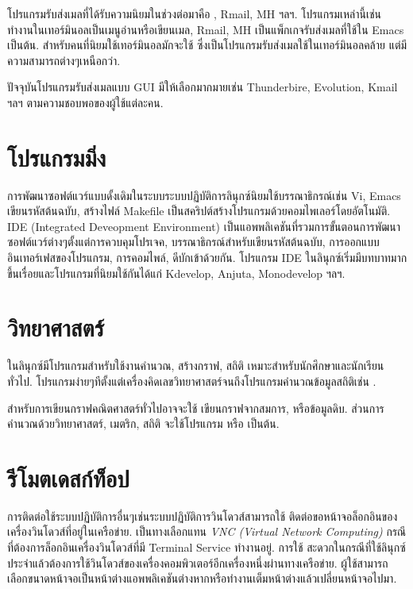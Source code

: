 \begin{thwbr}
โปรแกรมรับส่งเมลที่ได้รับความนิยมในช่วงต่อมาคือ , Rmail, MH ฯลฯ. โปรแกรมเหล่านี้เช่น  ทำงานในเทอร์มินอลเป็นเมนูอ่านหรือเขียนเมล, Rmail, MH เป็นแพ็กเกจรับส่งเมลที่ใช้ใน Emacs เป็นต้น. สำหรับคนที่นิยมใช้เทอร์มินอลมักจะใช้  ซึ่งเป็นโปรแกรมรับส่งเมลใช้ในเทอร์มินอลคล้าย  แต่มีความสามารถต่างๆเหนือกว่า.

ปัจจุบันโปรแกรมรับส่งเมลแบบ GUI มีให้เลือกมากมายเช่น Thunderbire, Evolution, Kmail ฯลฯ ตามความชอบพอของผู้ใช้แต่ละคน.



\section{โปรแกรมมิ่ง}
การพัฒนาซอฟต์แวร์แบบดั้งเดิมในระบบระบบปฏิบัติการลินุกซ์นิยมใช้บรรณาธิกรณ์เช่น Vi, Emacs เขียนรหัสต้นฉบับ, สร้างไฟล์ Makefile เป็นสคริปต์สร้างโปรแกรมด้วยคอมไพเลอร์โดยอัตโนมัติ. IDE (Integrated Deveopment Environment) เป็นแอพพลิเคชันที่รวมการขั้นตอนการพัฒนาซอฟต์แวร์ต่างๆตั้งแต่การควบคุมโปรเจค, บรรณาธิกรณ์สำหรับเขียนรหัสต้นฉบับ, การออกแบบอินเทอร์เฟสของโปรแกรม, การคอมไพล์, ดีบักเข้าด้วยกัน. โปรแกรม IDE ในลินุกซ์เริ่มมีบทบาทมากขึ้นเรื่อยและโปรแกรมที่นิยมใช้กันได้แก่ Kdevelop, Anjuta, Monodevelop ฯลฯ.  

\section{วิทยาศาสตร์}
ในลินุกซ์มีโปรแกรมสำหรับใช้งานคำนวณ, สร้างกราฟ, สถิติ เหมาะสำหรับนักศึกษาและนักเรียนทั่วไป. โปรแกรมง่ายๆทีตั้งแต่เครื่องคิดเลขวิทยาศาสตร์จนถึงโปรแกรมคำนวณข้อมูลสถิติเช่น . 

สำหรับการเขียนกราฟคณิตศาสตร์ทั่วไปอาจจะใช้  เขียนกราฟจากสมการ, หรือข้อมูลดิบ. ส่วนการคำนวณด้วยวิทยาศาสตร์, เมตริก, สถิติ จะใช้โปรแกรม  หรือ  เป็นต้น.

\section{รีโมตเดสก์ท็อป}
การติดต่อใช้ระบบปฏิบัติการอื่นๆเช่นระบบปฏิบัติการวินโดวส์สามารถใช้  ติดต่อขอหน้าจอล็อกอินของเครื่องวินโดวส์ที่อยู่ในเครือข่าย.  เป็นทางเลือกแทน \emph{VNC (Virtual Network Computing)} กรณีที่ต้องการล็อกอินเครื่องวินโดวส์ที่มี Terminal Service ทำงานอยู่. การใช้  สะดวกในกรณีที่ใช้ลินุกซ์ประจำแล้วต้องการใช้วินโดวส์ของเครื่องคอมพิวเตอร์อีกเครื่องหนึ่งผ่านทางเครือข่าย. ผู้ใช้สามารถเลือกขนาดหน้าจอเป็นหน้าต่างแอพพลิเคชันต่างหากหรือทำงานเต็มหน้าต่างแล้วเปลี่ยนหน้าจอไปมา.


\end{thwbr}
